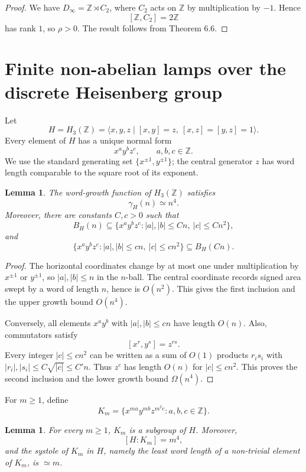 \documentclass[11pt]{article}
\newcommand{\Z}{\mathbb Z}
\newtheorem{lemma}[theorem]{Lemma}
\begin{document}
\begin{proof}
We have \(D_\infty=\Z\rtimes C_2\), where \(C_2\) acts on \(\Z\) by multiplication by \(-1\). Hence
\[
[\Z,C_2]=2\Z
\]
has rank \(1\), so \(\rho>0\). The result follows from Theorem 6.6.
\end{proof}

\section{Finite non-abelian lamps over the discrete Heisenberg group}

Let
\[
H=H_3(\Z)=\langle x,y,z\mid [x,y]=z,\ [x,z]=[y,z]=1\rangle.
\]
Every element of \(H\) has a unique normal form
\[
x^ay^bz^c,\qquad a,b,c\in\Z.
\]
We use the standard generating set \(\{x^{\pm 1},y^{\pm 1}\}\); the central generator \(z\) has word length comparable to the square root of its exponent.

\begin{lemma}
The word-growth function of \(H_3(\Z)\) satisfies
\[
\gamma_H(n)\simeq n^4.
\]
Moreover, there are constants \(C,c>0\) such that
\[
B_H(n)\subseteq \{x^ay^bz^c: |a|,|b|\le Cn,\ |c|\le Cn^2\},
\]
and
\[
\{x^ay^bz^c: |a|,|b|\le cn,\ |c|\le cn^2\}\subseteq B_H(Cn).
\]
\end{lemma}

\begin{proof}
The horizontal coordinates change by at most one under multiplication by \(x^{\pm1}\) or \(y^{\pm1}\), so \(|a|,|b|\le n\) in the \(n\)-ball. The central coordinate records signed area swept by a word of length \(n\), hence is \(O(n^2)\). This gives the first inclusion and the upper growth bound \(O(n^4)\).

Conversely, all elements \(x^ay^b\) with \(|a|,|b|\le cn\) have length \(O(n)\). Also, commutators satisfy
\[
[x^r,y^s]=z^{rs}.
\]
Every integer \(|c|\le cn^2\) can be written as a sum of \(O(1)\) products \(r_is_i\) with \(|r_i|,|s_i|\le C\sqrt{|c|}\le C'n\). Thus \(z^c\) has length \(O(n)\) for \(|c|\le cn^2\). This proves the second inclusion and the lower growth bound \(\Omega(n^4)\).
\end{proof}

For \(m\ge 1\), define
\[
K_m=\{x^{ma}y^{mb}z^{m^2c}:a,b,c\in\Z\}.
\]

\begin{lemma}
For every \(m\ge 1\), \(K_m\) is a subgroup of \(H\). Moreover,
\[
[H:K_m]=m^4,
\]
and the systole of \(K_m\) in \(H\), namely the least word length of a non-trivial element of \(K_m\), is \(\simeq m\).
\end{lemma}
\end{document}
